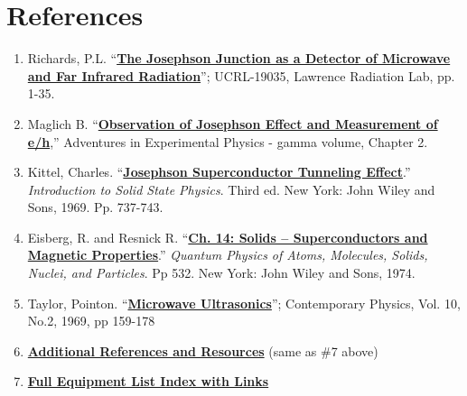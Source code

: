 \documentclass{../lab}
\begin{document}
\section{References}
\label{sec:References}

\begin{enumerate}
    \item Richards, P.L. ``\href{https://berkeley-physics111b.github.io/assets/pdf/oldwebsitestructure/JOS/References/06-The_Josephson_Junction_as_a_Detector.pdf}{\textbf{The Josephson Junction as a Detector of Microwave and Far Infrared Radiation}}''; UCRL-19035, Lawrence Radiation Lab, pp. 1-35.

    \item Maglich B. ``\href{https://berkeley-physics111b.github.io/assets/pdf/oldwebsitestructure/JOS/References/09-Observation_of_Josephson_Effect.pdf}{\textbf{Observation of Josephson Effect and Measurement of e/h}},'' Adventures in Experimental Physics - gamma volume, Chapter 2.

    \item Kittel, Charles. ``\href{https://berkeley-physics111b.github.io/assets/pdf/oldwebsitestructure/JOS/References/JOS_Introduction%20to%20the%20solid%20state%20physics.pdf}{\textbf{Josephson Superconductor Tunneling Effect}}.'' \emph{Introduction to Solid State Physics}. Third ed. New York: John Wiley and Sons, 1969. Pp. 737-743.

    \item Eisberg, R. and Resnick R. ``\href{https://berkeley-physics111b.github.io/assets/pdf/oldwebsitestructure/JOS/References/Semiconductors%20%26%20Magnetic%20Prop.%20Ch-14-pg.%20532.pdf}{\textbf{Ch. 14: Solids -- Superconductors and Magnetic Properties}}.” \emph{Quantum Physics of Atoms, Molecules, Solids, Nuclei, and Particles}. Pp 532. New York: John Wiley and Sons, 1974.

    \item Taylor, Pointon. ``\href{https://berkeley-physics111b.github.io/assets/pdf/oldwebsitestructure/JOS/References/07-Microwave_Ultrasonics.pdf}{\textbf{Microwave Ultrasonics}}''; Contemporary Physics, Vol. 10, No.2, 1969, pp 159-178

    \item    \href{https://berkeley-physics111b.github.io/assets/pdf/oldwebsitestructure/JOS/References/00-JOS_Additional%20References%20and%20Resources_Index.pdf}{\textbf{Additional References and Resources}} (same as \#7 above)

    \item
    \href{https://drive.google.com/file/d/1luos7-NeNfs_D4DeB8iM56PedPMNJaUJ/view?usp=drive_link}
    {\textbf{Full Equipment List Index with Links}}


\end{enumerate}
\end{document}
